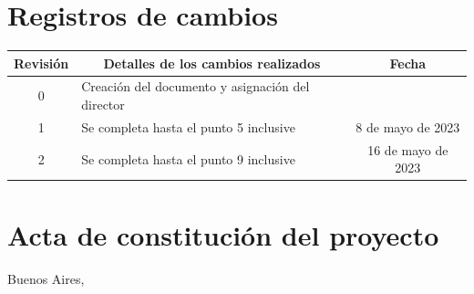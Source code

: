 \documentclass[
11pt, %
]{charter}
\begin{document}
\maketitle
\thispagestyle{empty}
\pagebreak


\thispagestyle{empty}
{\setlength{\parskip}{0pt}
\tableofcontents{}
}
\pagebreak


\section*{Registros de cambios}
\label{sec:registro}


\begin{table}[ht]
\label{tab:registro}
\centering
\begin{tabularx}{\linewidth}{@{}|c|X|c|@{}}
\hline
\rowcolor[HTML]{C0C0C0} 
Revisión & \multicolumn{1}{c|}{\cellcolor[HTML]{C0C0C0}Detalles de los cambios realizados} & Fecha      \\ \hline
0      & Creación del documento y asignación del director		&\fechaInicioName \\ \hline
1      & Se completa hasta el punto 5 inclusive             	& 8 de mayo de 2023 \\ \hline
2      & Se completa hasta el punto 9 inclusive				& 16 de mayo de 2023 \\ \hline
\end{tabularx}
\end{table}

\pagebreak



\section*{Acta de constitución del proyecto}
\label{sec:acta}

\begin{flushright}
Buenos Aires, \fechaInicioName
\end{flushright}

\vspace{1cm}
\end{document}
